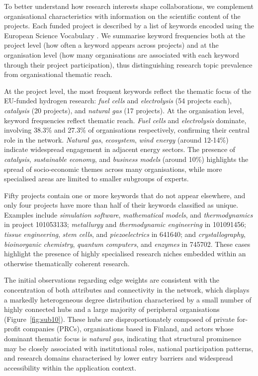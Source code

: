 \documentclass[11pt]{article}
\begin{document}
To better understand how research interests shape collaborations, we complement organisational characteristics with information on the scientific content of the projects. Each funded project is described by a list of keywords encoded using the European Science Vocabulary \citep[EuroSciVoc,][]{Euroscivoc}. We summarise keyword frequencies both at the project level (how often a keyword appears across projects) and at the organisation level (how many organisations are associated with each keyword through their project participation), thus distinguishing research topic prevalence from organisational thematic reach.

At the project level, the most frequent keywords reflect the thematic focus of the EU-funded hydrogen research: \textit{fuel cells} and \textit{electrolysis} (54 projects each), \textit{catalysis} (20 projects), and \textit{natural gas} (17 projects). At the organisation level, keyword frequencies reflect thematic reach. \textit{Fuel cells} and \textit{electrolysis} dominate, involving 38.3\% and 27.3\% of organisations respectively, confirming their central role in the network. \textit{Natural gas}, \textit{ecosystem}, \textit{wind energy} (around 12-14\%) indicate widespread engagement in adjacent energy sectors. The presence of \textit{catalysis}, \textit{sustainable economy}, and \textit{business models} (around 10\%) highlights the spread of socio-economic themes across many organisations, while more specialised areas are limited to smaller subgroups of experts. 

Fifty projects contain one or more keywords that do not appear elsewhere, and only four projects have more than half of their keywords classified as unique. Examples include \textit{simulation software}, \textit{mathematical models}, and \textit{thermodynamics} in project 101053133; \textit{metallurgy} and \textit{thermodynamic engineering} in 101091456; \textit{tissue engineering}, \textit{stem cells}, and \textit{piezoelectrics} in 641640; and \textit{crystallography}, \textit{bioinorganic chemistry}, \textit{quantum computers}, and \textit{enzymes} in 745702. These cases highlight the presence of highly specialised research niches embedded within an otherwise thematically coherent research.

The initial observations regarding edge weights are consistent with the concentration of both attributes and connectivity in the network, which displays a markedly heterogeneous degree distribution characterised by a small number of highly connected hubs and a large majority of peripheral organisations (Figure~\ref{fig:sub10}). These hubs are disproportionately composed of private for-profit companies (PRCs), organisations based in Finland, and actors whose dominant thematic focus is \textit{natural gas}, indicating that structural prominence may be closely associated with institutional roles, national participation patterns, and research domains characterised by lower entry barriers and widespread accessibility within the application context.
\end{document}
